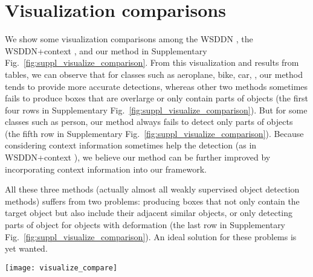 \documentclass[10pt,twocolumn,letterpaper]{article}
\begin{document}
\section{Visualization comparisons}

We show some visualization comparisons among the WSDDN \cite{Ref:Bilen2016}, the WSDDN+context \cite{Ref:Kantorov2016}, and our method in Supplementary Fig.~\ref{fig:suppl_visualize_comparison}.
From this visualization and results from tables, we can observe that for classes such as aeroplane, bike, car, \etc, our method tends to provide more accurate detections, whereas other two methods sometimes fails to produce boxes that are overlarge or only contain parts of objects (the first four rows in Supplementary Fig.~\ref{fig:suppl_visualize_comparison}).
But for some classes such as person, our method always fails to detect only parts of objects (the fifth row in Supplementary Fig.~\ref{fig:suppl_visualize_comparison}).
Because considering context information sometimes help the detection (as in WSDDN+context \cite{Ref:Kantorov2016}), we believe our method can be further improved by incorporating context information into our framework.

All these three methods (actually almost all weakly supervised object detection methods) suffers from two problems: producing boxes that not only contain the target object but also include their adjacent similar objects, or only detecting parts of object for objects with deformation (the last row in Supplementary Fig.~\ref{fig:suppl_visualize_comparison}).
An ideal solution for these problems is yet wanted.


\begin{figure*}[!t]
\begin{center}
   \texttt{[image: visualize\_compare]}
\end{center}
   \caption{Some visualization comparisons among the WSDDN \cite{Ref:Bilen2016}, the WSDDN+context \cite{Ref:Kantorov2016}, and our method (OICR).
   Green rectangle indicates success cases (IoU0.5), red rectangle indicates failure cases (IoU0.5), and yellow rectangle indicates ground truths.
   The first four rows show examples that our method outperforms other two methods (with larger IoU).
   The fifth row shows examples that our method is worse than other two methods (with smaller IoU).
   The last row shows failure examples for both three methods.
   }
\label{fig:suppl_visualize_comparison}
\end{figure*}
\end{document}
